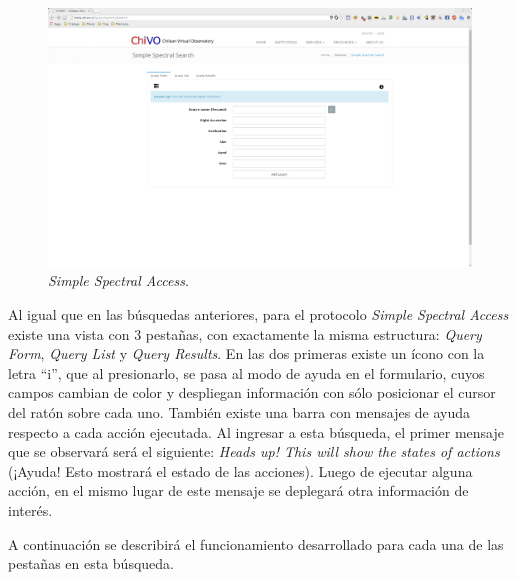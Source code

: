 \begin{figure}[ht!]
    \begin{center}
	\includegraphics[scale=.2]{img/ssa}
    \end{center}
    \caption{\emph{Simple Spectral Access}.}\label{img:ssa}
\end{figure}

Al igual que en las búsquedas anteriores, para el protocolo \emph{Simple
Spectral Access} existe una vista con 3 pestañas, con exactamente la
misma estructura: \emph{Query Form}, \emph{Query List} y \emph{Query
Results}. En las dos primeras existe un ícono con la letra ``i'', que
al presionarlo, se pasa al modo de ayuda en el formulario, cuyos
campos cambian de color y despliegan información con sólo posicionar
el cursor del ratón sobre cada uno. También existe una barra con
mensajes de ayuda respecto a cada acción ejecutada. Al ingresar a esta
búsqueda, el primer mensaje que se observará será el siguiente:
\emph{Heads up! This will show the states of actions} (¡Ayuda! Esto
mostrará el estado de las acciones). Luego de ejecutar alguna acción,
en el mismo lugar de este mensaje se deplegará otra información de
interés.

A continuación se describirá el funcionamiento desarrollado para cada
una de las pestañas en esta búsqueda.

